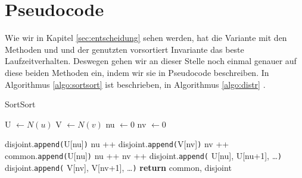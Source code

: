 

\section{Pseudocode}
Wie wir in Kapitel \ref{sec:entscheidung} sehen werden, 
hat die Variante mit den Methoden \SorSor{} und \distr{} und der genutzten vorsortiert
Invariante das beste Laufzeitverhalten. Deswegen gehen wir an dieser Stelle 
noch einmal genauer auf diese beiden Methoden ein, indem wir sie in Pseudocode
beschreiben. In Algorithmus \ref{algo:sortsort} ist \SorSor{} beschrieben, in Algorithmus \ref{algo:distr}
\distr.

\begin{algorithm}
  \caption{SortSort}\label{algo:sortsort}
  \begin{algorithmic}[1]
	  \State U $ \gets N(u)$ 
	  \State V $ \gets N(v)$ 
	  \State nu $\gets 0$ 
	  \State nv $\gets 0$ 
      
			\State disjoint.\texttt{append(}U[nu]\texttt{)} 
			\State nu ++
				\State disjoint.\texttt{append(}V[nv]\texttt{)} 
				\State nv ++
				\State common.\texttt{append(}U[nu]\texttt{)} 
				\State nu ++
				\State nv ++
        \EndIf
      \EndWhile
       
			\State disjoint.\texttt{append(} U[nu], U[nu+1], \dots\texttt{)}
			\Else{}
			\State disjoint.\texttt{append(} V[nv], V[nv+1], \dots\texttt{)}
      \EndIf
      \State \textbf{return} common, disjoint
   \EndProcedure
  \end{algorithmic}
  \label{algo:sortsort}
\end{algorithm}



